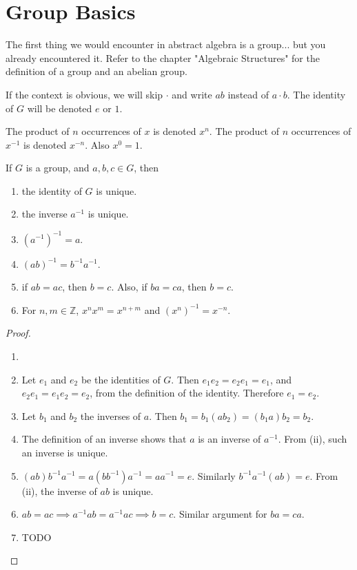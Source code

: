 

    \section{Group Basics}
    
    The first thing we would encounter in abstract algebra is a group... but you already encountered it. Refer to the chapter "Algebraic Structures" for the definition of a group and an abelian group.
    
    If the context is obvious, we will skip $\cdot$ and write $ab$ instead of $a \cdot b$. The identity of $G$ will be denoted $e$ or $1$.
    
    \begin{defn} \label{def_group_power}
        The product of $n$ occurrences of $x$ is denoted $x^n$. The product of $n$ occurrences of $x^{-1}$ is denoted $x^{-n}$. Also $x^0 = 1$.
    \end{defn}
    
    \begin{thm} \label{thm_group_basics}
        If $G$ is a group, and $a,b,c \in G$, then \begin{enumerate}
            \item the identity of $G$ is unique.
            \item the inverse $a^{-1}$ is unique.
            \item $(a^{-1})^{-1}=a$.
            \item $(ab)^{-1} = b^{-1}a^{-1}$.
            \item if $ab=ac$, then $b=c$. Also, if $ba=ca$, then $b=c$.
            \item For $n,m \in \mathbb{Z}$, $x^nx^m = x^{n+m}$ and $(x^n)^{-1} = x^{-n}.$
        \end{enumerate}
    \end{thm}
    
    \begin{proof}
        \begin{enumerate} \item[]
        \item Let $e_1$ and $e_2$ be the identities of $G$. Then $e_1e_2=e_2e_1=e_1$, and $e_2e_1=e_1e_2=e_2$, from the definition of the identity. Therefore $e_1=e_2$.
        \item Let $b_1$ and $b_2$ the inverses of $a$. Then $b_1 = b_1(ab_2) = (b_1a)b_2 = b_2$.
        \item The definition of an inverse shows that $a$ is an inverse of $a^{-1}$. From (ii), such an inverse is unique.
        \item $(ab)b^{-1}a^{-1} = a(bb^{-1})a^{-1} = aa^{-1} = e$. Similarly $b^{-1}a^{-1}(ab) = e$. From (ii), the inverse of $ab$ is unique.
        \item $ab=ac \implies a^{-1}ab=a^{-1}ac \implies b=c$. Similar argument for $ba=ca$.
        \item TODO
        \end{enumerate}
    \end{proof}
    
